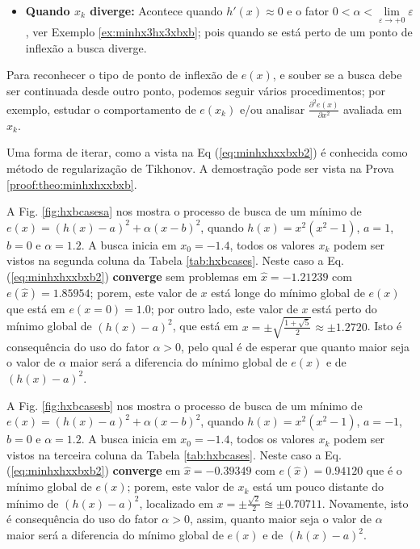 \begin{theorem}
\begin{itemize}
\item \textbf{Quando $x_{k}$ diverge:}  
Acontece quando $h'(x) \approx 0$ e o fator $0<\alpha<\lim\limits_{\varepsilon \rightarrow +0}\varepsilon$, 
ver Exemplo \ref{ex:minhx3hx3xbxb}; pois quando se está perto
de um ponto de inflexão a busca diverge. \\
\end{itemize}

Para reconhecer o tipo de ponto de inflexão de $e(x)$, e souber se 
a busca debe ser continuada desde outro ponto, 
podemos seguir vários procedimentos; por exemplo, estudar o comportamento 
de $e(x_k)$ e/ou analisar  $\frac{\partial^2 e(x)}{\partial x^2}$ avaliada em $x_k$.

Uma forma de iterar, como a vista na Eq (\ref{eq:minhxhxxbxb2}) é conhecida como 
método de regularização de Tikhonov.
A demostração pode ser vista na Prova \ref{proof:theo:minhxhxxbxb}.
\end{theorem}




\begin{example}\label{ex:minhxhxxbxb}
 A Fig. \ref{fig:hxbcasesa} nos mostra o processo de busca de um mínimo
 de $e(x)=(h(x)-a)^2+\alpha (x-b)^2$, quando $h(x)=x^2(x^2-1)$, $a=1$, $b=0$ e $\alpha=1.2$. A busca inicia em $x_0=-1.4$,
 todos os valores $x_{k}$ podem ser vistos na segunda coluna da
Tabela \ref{tab:hxbcases}. Neste caso a Eq. (\ref{eq:minhxhxxbxb2}) \textbf{converge} sem problemas 
em $\hat{x}=-1.21239$ com $e(\hat{x})=1.85954$; porem, 
 este valor de $x$ está longe do mínimo
 global de  $e(x)$ que está em $e(x=0)=1.0$; por outro lado, este valor de $x$
 está perto do mínimo global de  $(h(x)-a)^2$, que está em 
 $x=\pm\sqrt{\frac{1+\sqrt{5}}{2}}\approx \pm1.2720$. Isto é consequência do uso do fator 
 $\alpha>0$, pelo qual é de esperar que quanto maior seja o valor de $\alpha$
 maior será a diferencia do mínimo global de $e(x)$ e de $(h(x)-a)^2$.

 A Fig. \ref{fig:hxbcasesb} nos mostra o processo de busca de um mínimo
 de $e(x)=(h(x)-a)^2+\alpha (x-b)^2$, quando $h(x)=x^2(x^2-1)$, $a=-1$, $b=0$ e $\alpha=1.2$. A busca inicia em $x_0=-1.4$,
 todos os valores $x_{k}$ podem ser vistos na terceira coluna da
Tabela \ref{tab:hxbcases}. Neste caso a Eq. (\ref{eq:minhxhxxbxb2}) \textbf{converge} 
em $\hat{x}=-0.39349$ com $e(\hat{x})=0.94120$ que é o mínimo global de $e(x)$; porem, este valor de $x_k$ está
um pouco distante do mínimo de $(h(x)-a)^2$, localizado em $x=\pm\frac{\sqrt{2}}{2}\approxeq \pm0.70711$.
Novamente, isto é consequência do uso do fator 
 $\alpha>0$, assim, quanto maior seja o valor de $\alpha$
 maior será a diferencia do mínimo global de $e(x)$ e de $(h(x)-a)^2$.

\end{example}

